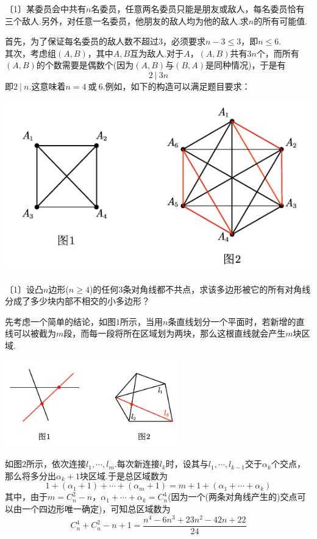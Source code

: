 \documentclass[cn,hazy,black,10pt,normal]{elegantnote}
\newenvironment{guess}{
  \color{guess}}{\newline \color{black}}
\newcommand{\nd}[1]{〔#1〕}
\begin{document}
\begin{problem} %
	\nd{1}某委员会中共有$n$名委员，任意两名委员只能是朋友或敌人，每名委员恰有三个敌人.另外，对任意一名委员，他朋友的敌人均为他的敌人.求$n$的所有可能值.
\end{problem}
\begin{solution}
	首先，为了保证每名委员的敌人数不超过$3$，必须要求$n-3 \leq 3$，即$n \leq 6$. \\
	其次，考虑组$(A,B)$，其中$A,B$互为敌人.对于$A$，$(A,B)$共有$3n$个，而所有$(A,B)$的个数需要是偶数个(因为$(A,B)$与$(B,A)$是同种情况)，于是有$$2~|~3n$$即$2~|~n$.这意味着$n=4~ \textit{或} ~6$.例如，如下的构造可以满足题目要求：
	\begin{center}
			\includegraphics{attachment/202302082.pdf}
	\end{center}
\end{solution}

\begin{problem} %
	\nd{1}设凸$n$边形($n \geq 4$)的任何$3$条对角线都不共点，求该多边形被它的所有对角线分成了多少块内部不相交的小多边形？
\end{problem}
\begin{solution}
	\begin{guess}
		先考虑一个简单的结论，如图$1$所示，当用$n$条直线划分一个平面时，若新增的直线可以被截为$m$段，而每一段将所在区域划为两块，那么这根直线就会产生$m$块区域.
	\end{guess}
	\begin{center}
			\includegraphics[width=7.5cm]{attachment/202302083.pdf}
	\end{center}
	如图$2$所示，依次连接$l_1, \cdots ,l_m$.每次新连接$l_k$时，设其与$l_1, \cdots ,l_{k-1}$交于$\alpha _k$个交点，那么将多分出$\alpha _k+1$块区域.于是总区域数为$$1 + (\alpha _1 +1) + \cdots + (\alpha _m + 1) = m+1 +(\alpha _1 + \cdots + \alpha _k)$$
	其中，由于$m=C_n^2-n$，$\alpha _1 + \cdots + \alpha _k = C_n^4$(因为一个(两条对角线产生的)交点可以由一个四边形唯一确定)，可知总区域数为$$C_n^4+C_n^2-n+1 = \frac{n^4 - 6n^3 + 23n^2 - 42n + 22}{24}$$
\end{solution}
\end{document}

